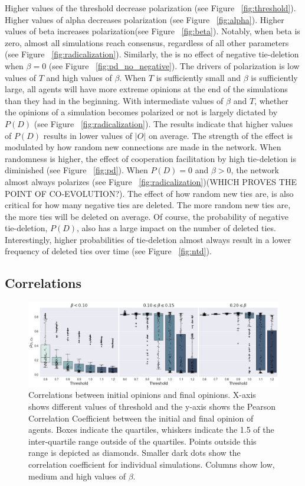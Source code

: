 \documentclass{article}
\begin{document}
Higher values of the threshold decrease polarization (see Figure ~\ref{fig:threshold}). Higher values of alpha decreases polarization (see Figure ~\ref{fig:alpha}). Higher values of beta increases polarization(see Figure ~\ref{fig:beta}). Notably, when beta is zero, almost all simulations reach consensus, regardless of all other parameters (see Figure ~\ref{fig:radicalization}). Similarly, the is no effect of negative tie-deletion when $\beta = 0$ (see Figure ~\ref{fig:pd_no_negative}). 
The drivers of polarization is low values of $T$ and high values of $\beta$. When $T$ is sufficiently small and $\beta$ is sufficiently large, all agents will have more extreme opinions at the end of the simulations than they had in the beginning. With intermediate values of $\beta$ and $T$, whether the opinions of a simulation becomes polarized or not is largely dictated by $P(D)$ (see Figure ~\ref{fig:radicalization}). 
The results indicate that higher values of $P(D)$ results in lower values of $|O|$ on average. 
The strength of the effect is modulated by how random new connections are made in the network. 
When randomness is higher, the effect of cooperation facilitation by high tie-deletion is diminished (see Figure ~\ref{fig:pd}). 
When $P(D) = 0$ and $\beta > 0$, the network almost always polarizes (see Figure ~\ref{fig:radicalization})(WHICH PROVES THE POINT OF CO-EVOLUTION?).
The effect of how random new ties are, is also critical for how many negative ties are deleted. 
The more random new ties are, the more ties will be deleted on average. Of course, the probability of negative tie-deletion, $P(D)$, also has a large impact on the number of deleted ties. 
Interestingly, higher probabilities of tie-deletion almost always result in a lower frequency of deleted ties over time (see Figure ~\ref{fig:ntd}).

\subsection{Correlations}

\begin{figure}[H]
    \centering
    \includegraphics[width=.8\linewidth]{../plots/overall/Correlation_Initial_Opinions.png}
  \caption{Correlations between initial opinions and final opinions. X-axis shows different values of threshold and the y-axis shows the Pearson Correlation Coefficient between the initial and final opinion of agents. Boxes indicate the quartiles, whiskers indicate the 1.5 of the inter-quartile range outside of the quartiles. Points outside this range is depicted as diamonds. Smaller dark dots show the correlation coefficient for individual simulations. Columns show low, medium and high values of $\beta$. }
  \label{fig:corr_initial_final}
\end{figure}
\end{document}
